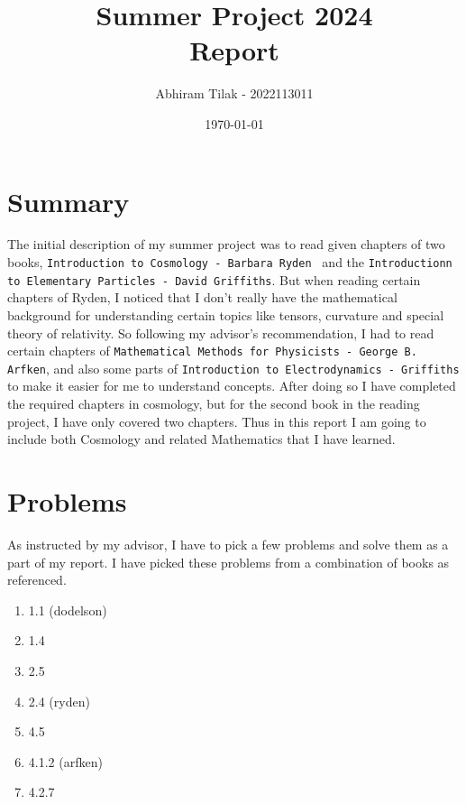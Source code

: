 \documentclass[11pt]{article}
\title{ Summer Project 2024 \\ Report }
\author{ Abhiram Tilak - 2022113011 }
\date{\today}
\begin{document}
\maketitle

\section{Summary}

The initial description of my summer project was to read given chapters of two
books, \texttt{Introduction to Cosmology - Barbara Ryden } and the
\texttt{Introductionn to Elementary Particles - David Griffiths}. But when
reading certain chapters of Ryden, I noticed that I don't really have the
mathematical background for understanding certain topics like tensors, curvature and
special theory of relativity. So following my advisor's recommendation, I
had to read certain chapters of
\texttt{Mathematical Methods for Physicists - George B. Arfken}, and also some
parts of \texttt{Introduction to Electrodynamics - Griffiths} to make it easier
for me to understand concepts. After doing so
I have completed the required chapters in cosmology, but for the second book
in the reading project, I have only covered two chapters. Thus in this report
I am going to include both Cosmology and related Mathematics that I have
learned.

\section{Problems}

As instructed by my advisor, I have to pick a few problems and solve them
as a part of my report. I have picked these problems from a combination of books
as referenced.

\begin{enumerate}
	\item 1.1 (dodelson)
	\item 1.4
	\item 2.5
	\item 2.4 (ryden)
	\item 4.5
	\item 4.1.2 (arfken)
	\item 4.2.7
\end{enumerate}
\end{document}
